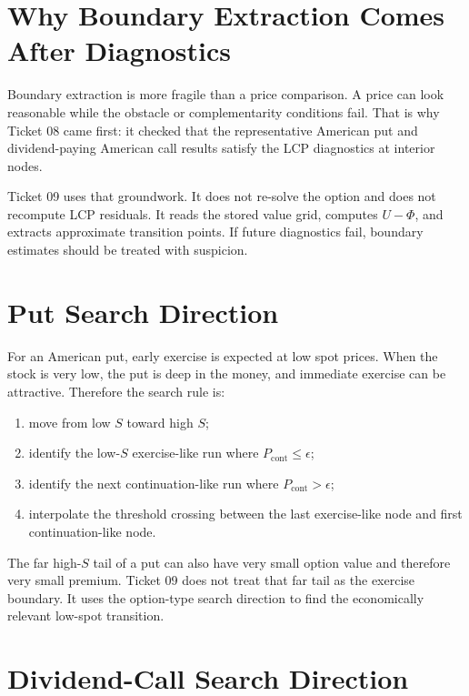 \documentclass[11pt,a4paper]{article}
\begin{document}
\section{Why Boundary Extraction Comes After Diagnostics}

Boundary extraction is more fragile than a price comparison. A price can look reasonable while
the obstacle or complementarity conditions fail. That is why Ticket 08 came first: it checked that
the representative American put and dividend-paying American call results satisfy the LCP
diagnostics at interior nodes.

Ticket 09 uses that groundwork. It does not re-solve the option and does not recompute LCP
residuals. It reads the stored value grid, computes \(U-\Phi\), and extracts approximate transition
points. If future diagnostics fail, boundary estimates should be treated with suspicion.

\section{Put Search Direction}

For an American put, early exercise is expected at low spot prices. When the stock is very low,
the put is deep in the money, and immediate exercise can be attractive. Therefore the search rule
is:
\begin{enumerate}
  \item move from low \(S\) toward high \(S\);
  \item identify the low-\(S\) exercise-like run where \(P_{\mathrm{cont}}\le\epsilon\);
  \item identify the next continuation-like run where \(P_{\mathrm{cont}}>\epsilon\);
  \item interpolate the threshold crossing between the last exercise-like node and first
  continuation-like node.
\end{enumerate}

The far high-\(S\) tail of a put can also have very small option value and therefore very small
premium. Ticket 09 does not treat that far tail as the exercise boundary. It uses the option-type
search direction to find the economically relevant low-spot transition.

\section{Dividend-Call Search Direction}
\end{document}
